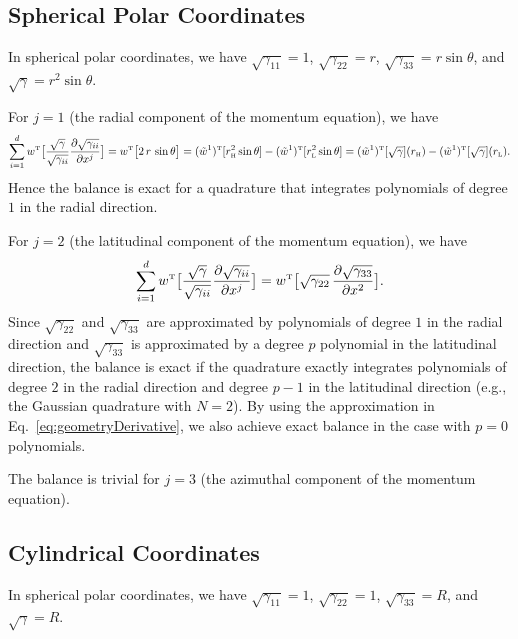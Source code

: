 \documentclass[10pt,preprint]{aastex}
\begin{document}
\subsection{Spherical Polar Coordinates}

In spherical polar coordinates, we have $\sqrt{\gamma_{11}}=1$, $\sqrt{\gamma_{22}}=r$, $\sqrt{\gamma_{33}}=r\sin\theta$, and $\sqrt{\gamma}=r^{2}\sin\theta$.  

For $j=1$ (the radial component of the momentum equation), we have
\begin{equation}
  \sum_{i=1}^{d}w^{\mbox{\tiny T}}
  \big[\frac{\sqrt{\gamma}}{\sqrt{\gamma_{ii}}}\frac{\partial \sqrt{\gamma_{ii}}}{\partial x^{j}}\big]
  =w^{\mbox{\tiny T}}\big[2\,r\,\sin\theta\big]
  =(\tilde{w}^{1})^{\mbox{\tiny T}}[r_{\mbox{\tiny H}}^{2}\sin\theta]-(\tilde{w}^{1})^{\mbox{\tiny T}}[r_{\mbox{\tiny L}}^{2}\sin\theta]
  =(\tilde{w}^{1})^{\mbox{\tiny T}}[\sqrt{\gamma}](r_{\mbox{\tiny H}})-(\tilde{w}^{1})^{\mbox{\tiny T}}[\sqrt{\gamma}](r_{\mbox{\tiny L}}).  
\end{equation}
Hence the balance is exact for a quadrature that integrates polynomials of degree $1$ in the radial direction.  

For $j=2$ (the latitudinal component of the momentum equation), we have
\begin{equation}
  \sum_{i=1}^{d}w^{\mbox{\tiny T}}
  \big[\frac{\sqrt{\gamma}}{\sqrt{\gamma_{ii}}}\frac{\partial \sqrt{\gamma_{ii}}}{\partial x^{j}}\big]
  =w^{\mbox{\tiny T}}\big[\sqrt{\gamma_{22}}\,\frac{\partial \sqrt{\gamma_{33}}}{\partial x^{2}}\big].  
\end{equation}
Since $\sqrt{\gamma_{22}}$ and $\sqrt{\gamma_{33}}$ are approximated by polynomials of degree $1$ in the radial direction and $\sqrt{\gamma_{33}}$ is approximated by a degree $p$ polynomial in the latitudinal direction, the balance is exact if the quadrature exactly integrates polynomials of degree $2$ in the radial direction and degree $p-1$ in the latitudinal direction (e.g., the Gaussian quadrature with $N=2$).  
By using the approximation in Eq.~\eqref{eq:geometryDerivative}, we also achieve exact balance in the case with $p=0$ polynomials.  

The balance is trivial for $j=3$ (the azimuthal component of the momentum equation).  

\subsection{Cylindrical Coordinates}

In spherical polar coordinates, we have $\sqrt{\gamma_{11}}=1$, $\sqrt{\gamma_{22}}=1$, $\sqrt{\gamma_{33}}=R$, and $\sqrt{\gamma}=R$.  
\end{document}
